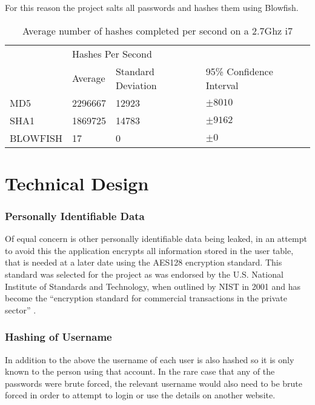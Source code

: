 For this reason the project salts all passwords and hashes them using Blowfish.

\begin{table}[h]
\begin{tabular}{llll}
         & \multicolumn{3}{l}{Hashes Per Second}                   \\
         & Average & Standard Deviation & 95\% Confidence Interval \\
MD5      & \num{2296667} & \num{12923}              & $\pm 8010$                 \\
SHA1     & \num{1869725} & \num{14783}             & $\pm 9162$                 \\
BLOWFISH & 17      & 0                   & $\pm 0$                    \\
\end{tabular}
\label{tab:hashspeed}
\caption{Average number of hashes completed per second on a 2.7Ghz i7 }
\end{table}

\section{Technical Design}

\subsubsection{Personally Identifiable Data}
Of equal concern is other personally identifiable data being leaked, in an attempt to avoid this the application encrypts all information stored in the user table, that is needed at a later date using the AES128 encryption standard. This standard was selected for the project as was endorsed by the U.S. National Institute of Standards and Technology, when outlined by NIST in 2001 and has become the ``encryption standard for commercial transactions in the private sector'' \cite{nist2010aes, stair2009informationsystems}.

\subsubsection{Hashing of Username}
In addition to the above the username of each user is also hashed so it is only known to the person using that account. In the rare case that any of the passwords were brute forced, the relevant username would also need to be brute forced in order to attempt to login or use the details on another website.

